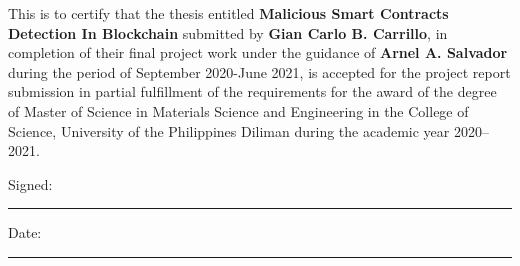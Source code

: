 \begin{approvalPage}

This is to certify  that the thesis entitled   \textbf{Malicious Smart  Contracts  Detection  In  Blockchain}  submitted by  \textbf{Gian Carlo B. Carrillo},  in completion of their final project work under the guidance of  \textbf{Arnel A. Salvador} during the period of September 2020-June 2021, is accepted for the project report submission in partial fulfillment of the requirements for the award of the degree of Master of Science in Materials Science and Engineering in the College of Science, University of the Philippines Diliman during the academic year 2020–2021.

\vspace{2.0cm}
Signed:\\
\rule[1em]{25em}{0.5pt}  %
 
Date:\\
\rule[1em]{25em}{0.5pt}  %

\end{approvalPage}

